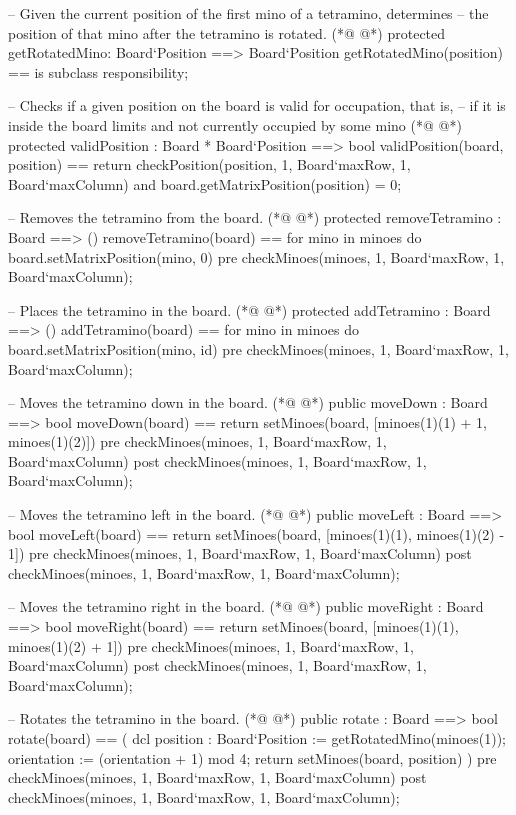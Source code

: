 \begin{vdmpp}[breaklines=true]
  -- Given the current position of the first mino of a tetramino, determines
  -- the position of that mino after the tetramino is rotated.
(*@
\label{getRotatedMino:128}
@*)
  protected getRotatedMino: Board`Position ==> Board`Position
  getRotatedMino(position) ==
   is subclass responsibility;

  -- Checks if a given position on the board is valid for occupation, that is, 
  -- if it is inside the board limits and not currently occupied by some mino
(*@
\label{validPosition:134}
@*)
  protected validPosition : Board * Board`Position ==> bool
  validPosition(board, position) == 
   return checkPosition(position, 1, Board`maxRow, 1, Board`maxColumn) 
    and board.getMatrixPosition(position) = 0;

  -- Removes the tetramino from the board.
(*@
\label{removeTetramino:140}
@*)
  protected removeTetramino : Board ==> ()
  removeTetramino(board) ==
   for mino in minoes do
    board.setMatrixPosition(mino, 0)
  pre checkMinoes(minoes, 1, Board`maxRow, 1, Board`maxColumn);

  -- Places the tetramino in the board.
(*@
\label{addTetramino:147}
@*)
  protected addTetramino : Board ==> ()
  addTetramino(board) ==
   for mino in minoes do
    board.setMatrixPosition(mino, id)
  pre checkMinoes(minoes, 1, Board`maxRow, 1, Board`maxColumn);

  -- Moves the tetramino down in the board.
(*@
\label{moveDown:154}
@*)
  public moveDown : Board ==> bool
  moveDown(board) == 
   return setMinoes(board, [minoes(1)(1) + 1, minoes(1)(2)])
  pre checkMinoes(minoes, 1, Board`maxRow, 1, Board`maxColumn)
  post checkMinoes(minoes, 1, Board`maxRow, 1, Board`maxColumn);
     
  -- Moves the tetramino left in the board.
(*@
\label{moveLeft:161}
@*)
  public moveLeft : Board ==> bool
  moveLeft(board) == 
   return setMinoes(board, [minoes(1)(1), minoes(1)(2) - 1])
  pre checkMinoes(minoes, 1, Board`maxRow, 1, Board`maxColumn)
  post checkMinoes(minoes, 1, Board`maxRow, 1, Board`maxColumn);
  
  -- Moves the tetramino right in the board.
(*@
\label{moveRight:168}
@*)
  public moveRight : Board ==> bool
  moveRight(board) == 
   return setMinoes(board, [minoes(1)(1), minoes(1)(2) + 1])
  pre checkMinoes(minoes, 1, Board`maxRow, 1, Board`maxColumn)
  post checkMinoes(minoes, 1, Board`maxRow, 1, Board`maxColumn);

  -- Rotates the tetramino in the board.
(*@
\label{rotate:175}
@*)
  public rotate : Board ==> bool
  rotate(board) == (
   dcl position : Board`Position := getRotatedMino(minoes(1));
   orientation := (orientation + 1) mod 4;
   return setMinoes(board, position)
  )
  pre checkMinoes(minoes, 1, Board`maxRow, 1, Board`maxColumn)
  post checkMinoes(minoes, 1, Board`maxRow, 1, Board`maxColumn);
  

\end{vdmpp}
